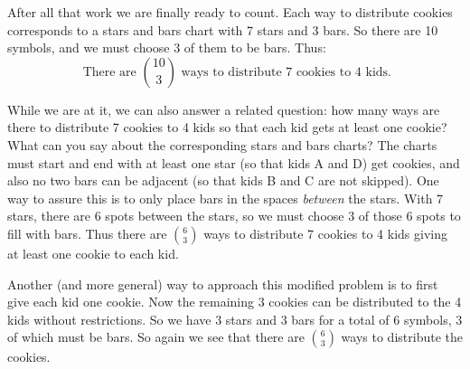 \documentclass[10pt,]{book}
\theoremstyle{plain}
\theoremstyle{definition}
\theoremstyle{definition}
\theoremstyle{definition}
\numberwithin{equation}{section}
\begin{document}
After all that work we are finally ready to count. Each way to distribute cookies corresponds to a stars and bars chart with 7 stars and 3 bars. So there are 10 symbols, and we must choose 3 of them to be bars. Thus:
\begin{equation*}
  \mbox{ There are } {10 \choose 3}\mbox{ ways to distribute 7 cookies to 4 kids.}
\end{equation*}
%
\par

While we are at it, we can also answer a related question: how many ways are there to distribute 7 cookies to 4 kids so that each kid gets at least one cookie? What can you say about the corresponding stars and bars charts? The charts must start and end with at least one star (so that kids A and D) get cookies, and also no two bars can be adjacent (so that kids B and C are not skipped). One way to assure this is to only place bars in the spaces \emph{between} the stars. With 7 stars, there are 6 spots between the stars, so we must choose 3 of those 6 spots to fill with bars. Thus there are \({6 \choose 3}\) ways to distribute 7 cookies to 4 kids giving at least one cookie to each kid.
%
\par

Another (and more general) way to approach this modified problem is to first give each kid one cookie. Now the remaining 3 cookies can be distributed to the 4 kids without restrictions. So we have 3 stars and 3 bars for a total of 6 symbols, 3 of which must be bars. So again we see that there are \({6 \choose 3}\) ways to distribute the cookies.
%
\par
\end{document}
